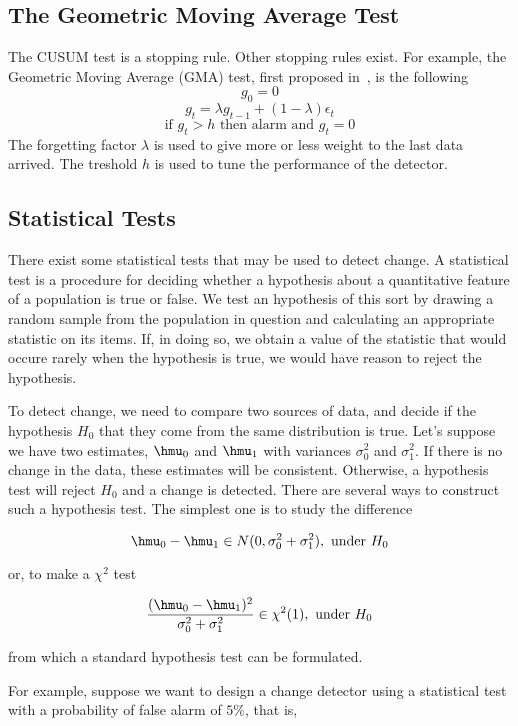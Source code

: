 \subsection{The Geometric Moving Average Test}
\label{Ssgma}
The CUSUM test is a stopping rule. Other stopping rules exist. For example, the Geometric Moving Average (GMA) test,
first proposed in~\cite{Roberts}, is the following
$$g_0=0$$
$$g_t= \lambda g_{t-1}+ ( 1- \lambda) \epsilon_t$$
$$\mbox{if } g_t>h \mbox{ then alarm and } g_t=0$$
The forgetting factor $\lambda$ is used to give more or less weight to the last data arrived.
The treshold $h$ is used to tune the performance of the detector.


\subsection{Statistical Tests}
\label{Ssstatic}

There exist some statistical tests that may be used to detect change.
A statistical test is a procedure for deciding whether a hypothesis 
about a quantitative feature of a population is true or false. We test 
an hypothesis of this sort by drawing a random sample from the population
 in question and calculating an appropriate statistic on its items. 
If, in doing so, we obtain a value of the statistic that would occure
 rarely when the hypothesis is true, we would have reason to reject the hypothesis. 

To detect change, we need to compare two sources of data, and decide if
the hypothesis $H_0$ that they come from the same distribution is true. 
Let's suppose we have two estimates, $\hmu_0$ and $\hmu_1$ with variances
$\sigma_0^2$ and $\sigma_1^2$. If there is no change in the data, 
these estimates will be consistent. Otherwise, a hypothesis test will
reject $H_0$ and a change is detected. There are several ways to construct
such a hypothesis test. The simplest one is to study the difference

$$ \hmu_0 - \hmu_1 \in N(0, \sigma_0^2+ \sigma_1^2), \mbox{ under } H_0$$

or, to make a $\chi^ 2$ test

$$ \frac{(\hmu_0 - \hmu_1)^ 2}{\sigma_0^2+ \sigma_1^2} \in \chi^ 2(1), \mbox{ under } H_0$$

from which a standard hypothesis test can be formulated. 

For example, suppose we want to design a change detector using a statistical test
with a probability of false alarm of $5\%$, that is,

